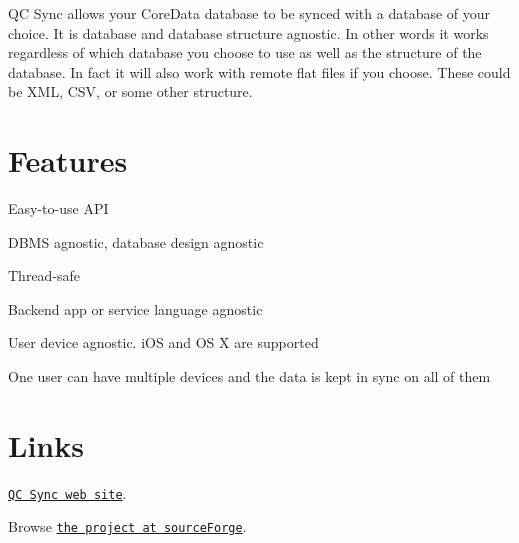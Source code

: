 QC Sync allows your CoreData database to be synced with a database of your choice. It is database and database structure agnostic. In other words it works regardless of which database you choose to use as well as the structure of the database. In fact it will also work with remote flat files if you choose. These could be XML, CSV, or some other structure.\hypertarget{index_Features}{}\section{Features}\label{index_Features}
\begin{DoxyItemize}
\item Easy-\/to-\/use API \item DBMS agnostic, database design agnostic \item Thread-\/safe \item Backend app or service language agnostic \item User device agnostic. iOS and OS X are supported \item One user can have multiple devices and the data is kept in sync on all of them\end{DoxyItemize}
\hypertarget{index_Links}{}\section{Links}\label{index_Links}
\begin{DoxyItemize}
\item \href{http://www.quickconnectfamily.org/qcdbsync}{\tt QC Sync web site}. \item Browse \href{http://sourceforge.net/projects/qcdbsync/}{\tt the project at sourceForge}. \end{DoxyItemize}
